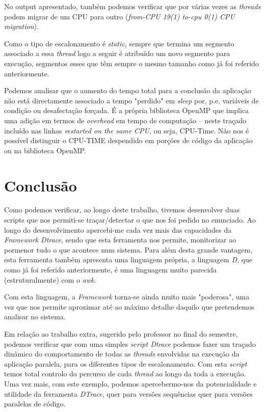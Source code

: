 \documentclass[conference,compsoc]{IEEEtran}
\begin{document}
No output apresentado, também podemos verificar que por várias vezes as \textit{threads} podem migrar de um CPU para outro (\textit{from-CPU 19(1) to-cpu 0(1) CPU migration}). 

Como o tipo de escalonamento é \textit{static}, sempre que termina um segmento associado a essa \textit{thread} logo a seguir é atribuído um novo segmento para execução, segmentos esses que têm sempre o mesmo tamanho como já foi referido anteriormente.

Podemos analisar que o aumento do tempo total para a conclusão da aplicação não está directamente associado a tempo "perdido" em \textit{sleep} por, p.e. variáveis de condição ou desafectação forçada. É a própria biblioteca OpenMP que implica uma adição em termos de \textit{overhead} em tempo de computação -- neste traçado incluído nas linhas \textit{restarted on the same CPU}, ou seja, CPU-Time. Não nos é possível distinguir o CPU-TIME despendido em porções de código da aplicação ou na biblioteca OpenMP.

\section{Conclusão}
Como podemos verificar, ao longo deste trabalho, tivemos desenvolver duas scripts que nos permiti-se traçar/detectar o que nos foi pedido no enunciado. Ao longo do desenvolvimento apercebi-me cada vez mais das capacidades da \textit{Framework Dtrace}, sendo que esta ferramenta nos permite, monitorizar ao pormenor tudo o que acontece num sistema. Para além desta grande vantagem, esta ferramenta também apresenta uma linguagem própria, a linguagem \textit{D}, que como já foi referido anteriormente, é uma linguagem muito parecida (estruturalmente) com o \textit{awk}.

Com esta linguagem, a \textit{Framework} torna-se ainda muito mais "poderosa", uma vez que nos permite aproximar até ao máximo detalhe daquilo que pretendemos analisar no sistema.

Em relação ao trabalho extra, sugerido pelo professor no final do semestre, podemos verificar que com uma simples \textit{script Dtrace} podemos fazer um traçado dinâmico do comportamento de todas as \textit{threads} envolvidas na execução da aplicação paralela, para os diferentes tipos de escalonamento. Com esta \textit{script} temos total controlo do percurso de cada \textit{thread} ao longo da toda a execução. Uma vez mais, com este exemplo, podemos apercebermo-nos da potencialidade e utilidade da ferramenta \textit{DTrace}, quer para versões sequências quer para versões paralelas de código.
\end{document}
